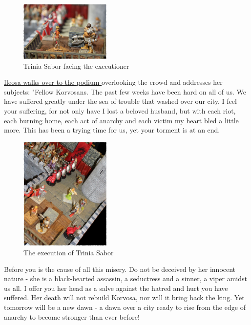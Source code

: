 \begin{figure}[h]
	\centering
	\includegraphics[width=0.4\textwidth]{images/Trinia-Sabor-facing-the-executioner-470603042_mod.jpg}
	\caption{Trinia Sabor facing the executioner}
	\label{fig:Trinia-Sabor-facing-the-executioner-470603042}
\end{figure}

\hyperref[fig:The-execution-of-Trinia-Sabor-470602177]{ Ileosa walks over to the podium } overlooking the crowd and addresses her subjects: "Fellow Korvosans. The past few weeks have been hard on all of us. We have suffered greatly under the sea of trouble that washed over our city. I feel your suffering, for not only have I lost a beloved husband, but with each riot, each burning home, each act of anarchy and each victim my heart bled a little more. This has been a trying time for us, yet your torment is at an end. \\

\begin{figure}[h]
	\centering
	\includegraphics[width=0.4\textwidth]{images/The-execution-of-Trinia-Sabor-470602177_mod.jpg}
	\caption{The execution of Trinia Sabor}
	\label{fig:The-execution-of-Trinia-Sabor-470602177}
\end{figure}

Before you is the cause of all this misery. Do not be deceived by her innocent nature - she is a black-hearted assassin, a seductress and a sinner, a viper amidst us all. I offer you her head as a salve against the hatred and hurt you have suffered. Her death will not rebuild Korvosa, nor will it bring back the king. Yet tomorrow will be a new dawn - a dawn over a city ready to rise from the edge of anarchy to become stronger than ever before!\\

